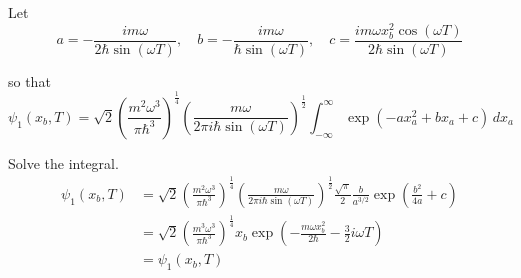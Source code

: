 Let
\begin{equation*}
a=-\frac{im\omega}{2\hbar\sin(\omega T)},\quad
b=-\frac{im\omega}{\hbar\sin(\omega T)},\quad
c=\frac{im\omega x_b^2\cos(\omega T)}{2\hbar\sin(\omega T)}
\end{equation*}

so that
\begin{equation*}
\psi_1(x_b,T)
=\sqrt2\left(\frac{m^2\omega^3}{\pi\hbar^3}\right)^\frac{1}{4}
\left(\frac{m\omega}{2\pi i\hbar\sin(\omega T)}\right)^\frac{1}{2}
\int_{-\infty}^\infty
\exp(-ax_a^2+bx_a+c)\,dx_a
\end{equation*}

Solve the integral.
\begin{align*}
\psi_1(x_b,T)
&=\sqrt2\left(\frac{m^2\omega^3}{\pi\hbar^3}\right)^\frac{1}{4}
\left(\frac{m\omega}{2\pi i\hbar\sin(\omega T)}\right)^\frac{1}{2}
\frac{\sqrt\pi}{2}\frac{b}{a^{3/2}}\exp\left(\frac{b^2}{4a}+c\right)
\\
&=\sqrt2\left(\frac{m^3\omega^3}{\pi\hbar^3}\right)^\frac{1}{4}
x_b\exp\left(-\frac{m\omega x_b^2}{2\hbar}-\tfrac{3}{2}i\omega T\right)
\\
&=\psi_1(x_b,T)
\end{align*}


